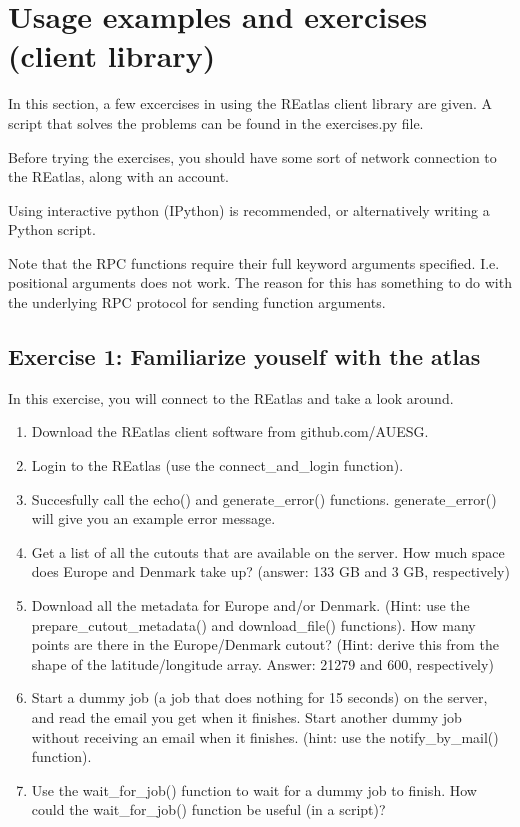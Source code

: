 \documentclass[a4paper,10pt]{article}
\begin{document}
\section{Usage examples and exercises (client library)}

In this section, a few excercises in using the REatlas client library are given.
A script that solves the problems can be found in the exercises.py file.

Before trying the exercises, you should have some sort of network connection
to the REatlas, along with an account.

Using interactive python (IPython) is recommended, or alternatively
writing a Python script.

Note that the RPC functions require their full keyword arguments
specified. I.e. positional arguments does not work.
The reason for this has something to do with the underlying RPC protocol 
for sending function arguments.


\subsection{Exercise 1: Familiarize youself with the atlas}

In this exercise, you will connect to the REatlas and take a look around.

\begin{enumerate}
     \item Download the REatlas client software from github.com/AUESG.
     \item Login to the REatlas (use the connect\_and\_login function).
     \item Succesfully call the echo() and generate\_error() functions.
           generate\_error() will give you an example error message.
     \item Get a list of all the cutouts that are available on the server.
           How much space does Europe and Denmark take up?
           (answer: 133 GB and 3 GB, respectively)
     \item Download all the metadata for Europe and/or Denmark.
           (Hint: use the prepare\_cutout\_metadata() and download\_file() functions).
           How many points are there in the Europe/Denmark cutout?
           (Hint: derive this from the shape of the latitude/longitude array.
           Answer: 21279 and 600, respectively)
      \item Start a dummy job (a job that does nothing for 15 seconds) on
           the server, and read the email you get when it finishes.
           Start another dummy job without receiving an email when it finishes.
           (hint: use the notify\_by\_mail() function).

      \item Use the wait\_for\_job() function to wait for a dummy job to finish.
           How could the wait\_for\_job() function be useful (in a script)?

\end{enumerate}
\end{document}
